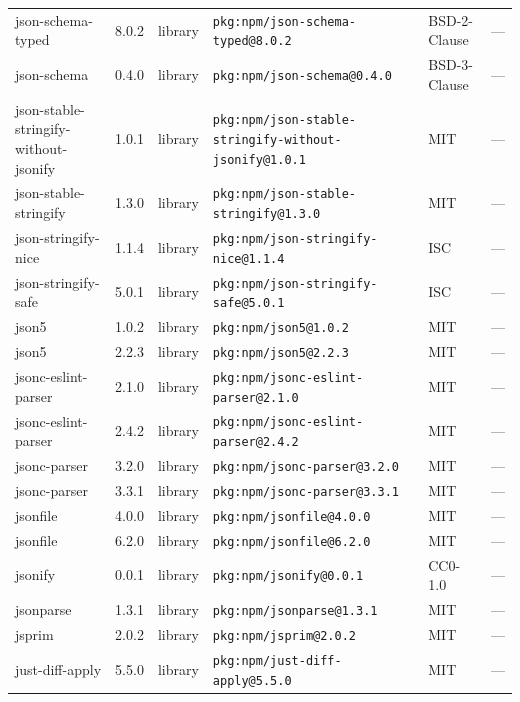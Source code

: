 \documentclass[11pt,a4paper]{article}
\begin{document}
\begin{longtable}{|p{4cm}|p{2cm}|p{1.6cm}|p{5cm}|p{1.5cm}|p{3.5cm}|}
\raggedright json-schema-typed & 8.0.2 & library & \small\texttt{pkg:npm/json-schema-typed@8.0.2} & BSD-2-Clause & \small — \\
\raggedright json-schema & 0.4.0 & library & \small\texttt{pkg:npm/json-schema@0.4.0} & BSD-3-Clause & \small — \\
\raggedright json-stable-stringify-without-jsonify & 1.0.1 & library & \small\texttt{pkg:npm/json-stable-stringify-without-jsonify@1.0.1} & MIT & \small — \\
\raggedright json-stable-stringify & 1.3.0 & library & \small\texttt{pkg:npm/json-stable-stringify@1.3.0} & MIT & \small — \\
\raggedright json-stringify-nice & 1.1.4 & library & \small\texttt{pkg:npm/json-stringify-nice@1.1.4} & ISC & \small — \\
\raggedright json-stringify-safe & 5.0.1 & library & \small\texttt{pkg:npm/json-stringify-safe@5.0.1} & ISC & \small — \\
\raggedright json5 & 1.0.2 & library & \small\texttt{pkg:npm/json5@1.0.2} & MIT & \small — \\
\raggedright json5 & 2.2.3 & library & \small\texttt{pkg:npm/json5@2.2.3} & MIT & \small — \\
\raggedright jsonc-eslint-parser & 2.1.0 & library & \small\texttt{pkg:npm/jsonc-eslint-parser@2.1.0} & MIT & \small — \\
\raggedright jsonc-eslint-parser & 2.4.2 & library & \small\texttt{pkg:npm/jsonc-eslint-parser@2.4.2} & MIT & \small — \\
\raggedright jsonc-parser & 3.2.0 & library & \small\texttt{pkg:npm/jsonc-parser@3.2.0} & MIT & \small — \\
\raggedright jsonc-parser & 3.3.1 & library & \small\texttt{pkg:npm/jsonc-parser@3.3.1} & MIT & \small — \\
\raggedright jsonfile & 4.0.0 & library & \small\texttt{pkg:npm/jsonfile@4.0.0} & MIT & \small — \\
\raggedright jsonfile & 6.2.0 & library & \small\texttt{pkg:npm/jsonfile@6.2.0} & MIT & \small — \\
\raggedright jsonify & 0.0.1 & library & \small\texttt{pkg:npm/jsonify@0.0.1} & CC0-1.0 & \small — \\
\raggedright jsonparse & 1.3.1 & library & \small\texttt{pkg:npm/jsonparse@1.3.1} & MIT & \small — \\
\raggedright jsprim & 2.0.2 & library & \small\texttt{pkg:npm/jsprim@2.0.2} & MIT & \small — \\
\raggedright just-diff-apply & 5.5.0 & library & \small\texttt{pkg:npm/just-diff-apply@5.5.0} & MIT & \small — \\

\end{longtable}
\end{document}
